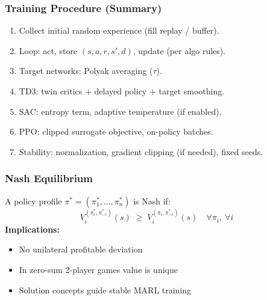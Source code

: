 \begin{frame}
  \frametitle{Training Procedure (Summary)}
  \small
  \begin{enumerate}\setlength{\itemsep}{2pt}
    \item Collect initial random experience (fill replay / buffer).
    \item Loop: act, store $(s,a,r,s',d)$, update (per algo rules).
    \item Target networks: Polyak averaging ($\tau$).
    \item TD3: twin critics + delayed policy + target smoothing.
    \item SAC: entropy term, adaptive temperature (if enabled).
    \item PPO: clipped surrogate objective, on-policy batches.
    \item Stability: normalization, gradient clipping (if needed), fixed seeds.
  \end{enumerate}
\end{frame}

\begin{frame}
    \frametitle{Nash Equilibrium}
    \small
    A policy profile $\pi^*=(\pi_1^*,\dots,\pi_n^*)$ is Nash if:
    \[
      V_i^{(\pi_i^*,\pi_{-i}^*)}(s)\;\ge\;V_i^{(\pi_i,\pi_{-i}^*)}(s)\quad \forall \pi_i,\ \forall i
    \]
    \textbf{Implications:}
    \begin{itemize}\setlength{\itemsep}{2pt}
        \item No unilateral profitable deviation
        \item In zero-sum 2-player games value is unique
        \item Solution concepts guide stable MARL training
    \end{itemize}
\end{frame}